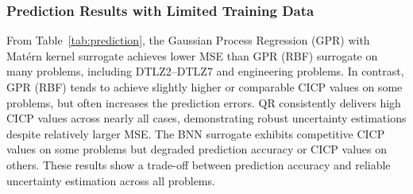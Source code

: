 \documentclass{article}
\begin{document}
\subsubsection{Prediction Results with Limited Training Data}
From Table~\ref{tab:prediction}, the Gaussian Process Regression (GPR) with Matérn kernel surrogate \cite{kernel_Matern_52} achieves lower MSE than GPR (RBF) surrogate \cite{gaussian_kernel} on many problems, including DTLZ2–DTLZ7 and engineering problems. In contrast, GPR (RBF) tends to achieve slightly higher or comparable CICP values on some problems, but often increases the prediction errors. QR \cite{ml_autogluon} consistently delivers high CICP values across nearly all cases, demonstrating robust uncertainty estimations despite relatively larger MSE. The BNN \cite{bnn} surrogate exhibits competitive CICP values on some problems but degraded prediction accuracy or CICP values on others. These results show a trade-off between prediction accuracy and reliable uncertainty estimation across all problems.
\end{document}
